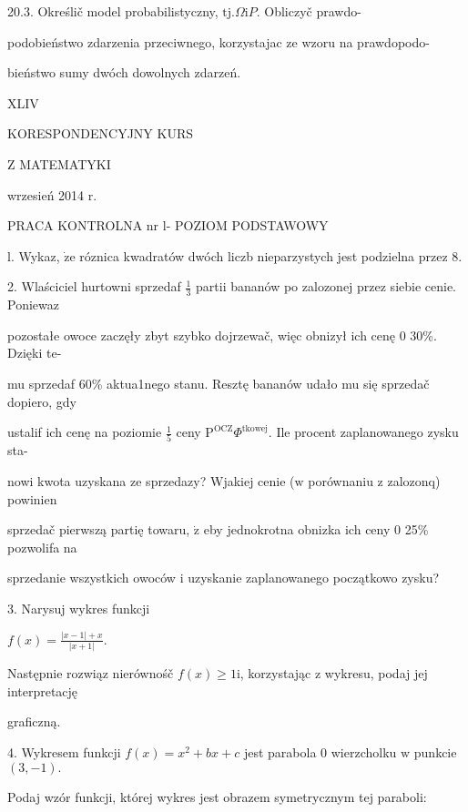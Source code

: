 \documentclass[a4paper,12pt]{article}
\begin{document}
20.3. Określič model probabilistyczny, $\mathrm{t}\mathrm{j}. \Omega \mathrm{i} P$. Obliczyč prawdo-

podobieństwo zdarzenia przeciwnego, korzystajac ze wzoru na prawdopodo-

bieństwo sumy dwóch dowolnych zdarzeń.







XLIV

KORESPONDENCYJNY KURS

Z MATEMATYKI

wrzesień 2014 r.

PRACA KONTROLNA nr l- POZIOM PODSTAWOWY

l. Wykaz, $\dot{\mathrm{z}}\mathrm{e}$ róznica kwadratów dwóch liczb nieparzystych jest podzielna przez 8.

2. Wlaściciel hurtowni sprzedaf $\displaystyle \frac{1}{3}$ partii bananów po zalozonej przez siebie cenie. Poniewaz

pozostałe owoce zaczęły zbyt szybko dojrzewač, więc obnizył ich cenę $0$ 30\%. Dzięki te-

mu sprzedaf 60\% aktua1nego stanu. Resztę bananów udało mu się sprzedač dopiero, gdy

ustalif ich cenę na poziomie $\displaystyle \frac{1}{5}$ ceny $\mathrm{P}^{\mathrm{O}\mathrm{C}\mathrm{Z}}\Phi^{\mathrm{t}\mathrm{k}\mathrm{o}\mathrm{w}\mathrm{e}\mathrm{j}}$. Ile procent zaplanowanego zysku sta-

nowi kwota uzyskana ze sprzedazy? Wjakiej cenie ($\mathrm{w}$ porównaniu $\mathrm{z}$ zalozonq) powinien

sprzedač pierwszą partię towaru, $\dot{\mathrm{z}}$ eby jednokrotna obnizka ich ceny $0$ 25\% pozwolifa na

sprzedanie wszystkich owoców $\mathrm{i}$ uzyskanie zaplanowanego początkowo zysku?

3. Narysuj wykres funkcji

$f(x)=\displaystyle \frac{|x-1|+x}{|x+1|}.$

Następnie rozwiąz nierównośč $f(x)\geq 1 \mathrm{i}$, korzystając $\mathrm{z}$ wykresu, podaj jej interpretację

graficzną.

4. Wykresem funkcji $f(x) =x^{2}+bx+c$ jest parabola $0$ wierzcholku $\mathrm{w}$ punkcie $(3,-1).$

Podaj wzór funkcji, której wykres jest obrazem symetrycznym tej paraboli:
\end{document}
